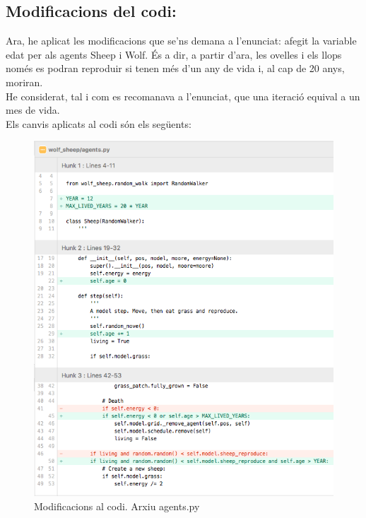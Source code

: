 \documentclass{article} %
\begin{document}
{	\subsection*{Modificacions del codi:}
	Ara, he aplicat les modificacions que se'ns demana a l'enunciat: afegit la variable edat per als agents Sheep i Wolf. És a dir, a partir d'ara, les ovelles i els llops només es podran reproduir si tenen més d'un any de vida i, al cap de 20 anys, moriran. \\

	He considerat, tal i com es recomanava a l'enunciat, que una iteració equival a un mes de vida. \\

	Els canvis aplicats al codi són els següents: \\

	\begin{figure}[H]
		\begin{changemargin}{-1cm}{0.5cm}
			\includegraphics[width=14cm]{code/agents_1}
			\centering
			\color{blue}
			\caption{Modificacions al codi. Arxiu agents.py}\label{visina8}
		\end{changemargin}
	\end{figure}

}
\end{document}
